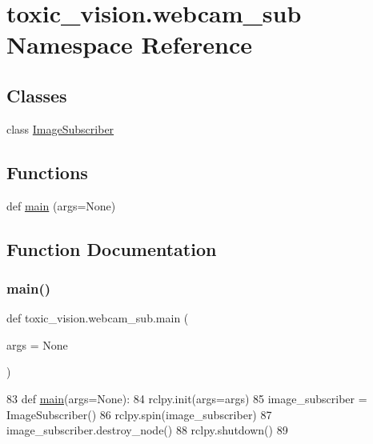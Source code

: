 \hypertarget{namespacetoxic__vision_1_1webcam__sub}{}\section{toxic\+\_\+vision.\+webcam\+\_\+sub Namespace Reference}
\label{namespacetoxic__vision_1_1webcam__sub}
\subsection*{Classes}
\begin{DoxyCompactItemize}
\item 
class \mbox{\hyperlink{classtoxic__vision_1_1webcam__sub_1_1ImageSubscriber}{Image\+Subscriber}}
\end{DoxyCompactItemize}
\subsection*{Functions}
\begin{DoxyCompactItemize}
\item 
def \mbox{\hyperlink{namespacetoxic__vision_1_1webcam__sub_ae5a86a4c83b069a7d8ab88d2836d2e6e}{main}} (args=None)
\end{DoxyCompactItemize}


\subsection{Function Documentation}
\mbox{\label{namespacetoxic__vision_1_1webcam__sub_ae5a86a4c83b069a7d8ab88d2836d2e6e}} 
\subsubsection{\texorpdfstring{main()}{main()}}
{\footnotesize\ttfamily def toxic\+\_\+vision.\+webcam\+\_\+sub.\+main (\begin{DoxyParamCaption}\item[{}]{args = {\ttfamily None} }\end{DoxyParamCaption})}


\begin{DoxyCode}
83 \textcolor{keyword}{def }\mbox{\hyperlink{namespacetoxic__vision_1_1webcam__sub_ae5a86a4c83b069a7d8ab88d2836d2e6e}{main}}(args=None):
84     rclpy.init(args=args)
85     image\_subscriber = ImageSubscriber()
86     rclpy.spin(image\_subscriber)
87     image\_subscriber.destroy\_node()
88     rclpy.shutdown()
89   
\end{DoxyCode}
